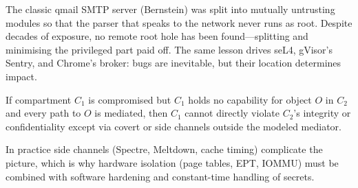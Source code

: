 \begin{example}
The classic qmail SMTP server (Bernstein) was split into mutually untrusting modules so that the parser that speaks to the network never runs as root. Despite decades of exposure, no remote root hole has been found---splitting and minimising the privileged part paid off. The same lesson drives seL4, gVisor's Sentry, and Chrome's broker: bugs are inevitable, but their location determines impact.
\end{example}
\begin{theorem}
If compartment $C_1$ is compromised but $C_1$ holds no capability for object $O$ in $C_2$ and every path to $O$ is mediated, then $C_1$ cannot directly violate $C_2$'s integrity or confidentiality except via covert or side channels outside the modeled mediator.
\end{theorem}
In practice side channels (Spectre, Meltdown, cache timing) complicate the picture, which is why hardware isolation (page tables, EPT, IOMMU) must be combined with software hardening and constant-time handling of secrets.
